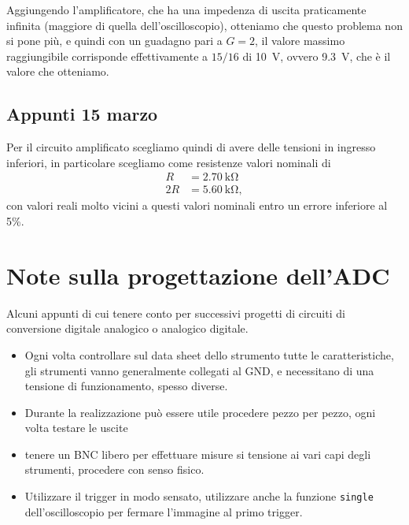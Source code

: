 \documentclass[
    rmp,
    reprint, 
    superscriptaddress, 
    altaffilletter, 
    amsmath, 
    amssymb, 
    a4paper,
    fleqn]{revtex4-2}
\begin{document}
Aggiungendo l'amplificatore, che ha una impedenza di uscita praticamente infinita (maggiore di quella dell'oscilloscopio), otteniamo che questo problema non si pone più, e quindi con un guadagno pari a $G=2$, il valore massimo raggiungibile corrisponde effettivamente a $15/16$ di \SI{10}{\volt}, ovvero \SI{9.3}{\volt}, che è il valore che otteniamo.  

\subsection{Appunti 15 marzo}
Per il circuito amplificato scegliamo quindi di avere delle tensioni in ingresso inferiori, in particolare scegliamo come resistenze valori nominali di \begin{align*}
    R &= \SI{2.70}{\kilo\ohm}\\
    2R &= \SI{5.60}{\kilo\ohm},
\end{align*} con valori reali molto vicini a questi valori nominali entro un errore inferiore al 5\%.

\section{Note sulla progettazione dell'ADC}

Alcuni appunti di cui tenere conto per successivi progetti di circuiti di conversione digitale analogico o analogico digitale.

\begin{itemize}
    \item Ogni volta controllare sul data sheet dello strumento tutte le caratteristiche, gli strumenti vanno generalmente collegati al GND, e necessitano di una tensione di funzionamento, spesso diverse. 
    \item Durante la realizzazione può essere utile procedere pezzo per pezzo, ogni volta testare le uscite
    \item tenere un BNC libero per effettuare misure si tensione ai vari capi degli strumenti, procedere con senso fisico. 
    \item Utilizzare il trigger in modo sensato, utilizzare anche la funzione \verb-single- dell'oscilloscopio per fermare l'immagine al primo trigger.
\end{itemize}
    

\appendix

\setcounter{table}{0}
\renewcommand{\thetable}{A-\Roman{table}}
\end{document}
